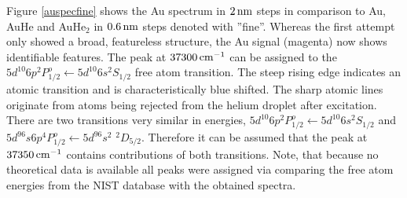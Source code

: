 \documentclass[parskip,12pt,headsepline,a4paper] {scrbook}
\begin{document}
Figure \ref{auspecfine} shows the Au spectrum in $\unit[2]{nm}$ steps in comparison to Au, AuHe and AuHe$_2$ in $\unit[0.6]{nm}$ steps denoted with ''fine''. Whereas the first attempt only showed a broad, featureless structure, the Au signal (magenta) now shows identifiable features. The peak at $\unit[37300]{cm^{-1}}$ can be assigned to the $5d^{10}6p ^2P^o_{1/2} \leftarrow 5d^{10}6s ^2S_{1/2}$ free atom transition. The steep rising edge indicates an atomic transition and is characteristically blue shifted.
The sharp atomic lines originate from atoms being rejected from the helium droplet after excitation. There are two transitions very similar in energies, $5d^{10}6p ^2P^o_{1/2} \leftarrow 5d^{10}6s ^2S_{1/2}$ and $5d^96s6p ^4P^o_{1/2} \leftarrow 5d^96s^2$ $^2D_{5/2}$. Therefore it can be assumed that the peak at $\unit[37350]{cm^{-1}}$ contains contributions of both transitions. Note, that because no theoretical data is available all peaks were assigned via comparing the free atom energies from the NIST database with the obtained spectra.
\end{document}
